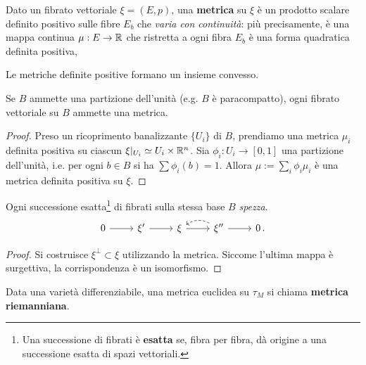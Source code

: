 



\begin{df}
	Dato un fibrato vettoriale $\xi = (E,p)$,
	una \textbf{metrica} su $\xi$ è un prodotto scalare definito positivo
	sulle fibre $E_{b}$ che \emph{varia con continuità}: più precisamente,
	è una mappa continua $\mu:E \to {\mathbb R}$ che ristretta a ogni fibra
	$E_{b}$ è una forma quadratica definita positiva,
\end{df}

\begin{oss}
	Le metriche definite positive formano un insieme convesso.
\end{oss}


\begin{prop}
	Se $B$ ammette una partizione dell'unità (e.g. $B$ è paracompatto),
	ogni fibrato vettoriale su $B$ ammette una metrica.
	\begin{proof}
		Preso un ricoprimento banalizzante $\{U_{i}\}$ di $B$,
prendiamo una metrica $\mu_{i}$ definita positiva
su ciascun $\xi\vert_{U_{i}} \simeq U_{i} \times {\mathbb R}^{n}$.
Sia $\phi_{i}:U_{i}\to [0,1]$ una partizione dell'unità, i.e.
per ogni $b \in B$ si ha $\sum \phi_{i}(b) = 1$.
Allora $\mu := \sum_{i} \phi_{i}\mu_{i}$ è una metrica definita positiva su $\xi$.
	\end{proof}
\end{prop}	


\begin{cor}
	Ogni successione esatta\footnote{Una successione di fibrati è \textbf{esatta} se, fibra per fibra, dà origine a una successione esatta di spazi vettoriali.} di fibrati sulla stessa base $B$  \emph{spezza}.
	\begin{equation*}
		\begin{tikzcd}
			0 \ar[r]
			& \xi' \ar[r]
			& \xi \ar[r]
			& \xi'' \ar[r] \ar[l, bend right, dashed]
			& 0\,.
		\end{tikzcd}
	\end{equation*}
	\begin{proof}
		Si costruisce $\xi^{\perp} \subset \xi$ utilizzando la metrica.
		Siccome l'ultima mappa è surgettiva, la corrispondenza è un isomorfismo.
	\end{proof}
\end{cor}

\begin{df}
	Data una varietà differenziabile,
	una metrica euclidea su $\tau_{M}$ si chiama \textbf{metrica riemanniana}.
\end{df}


